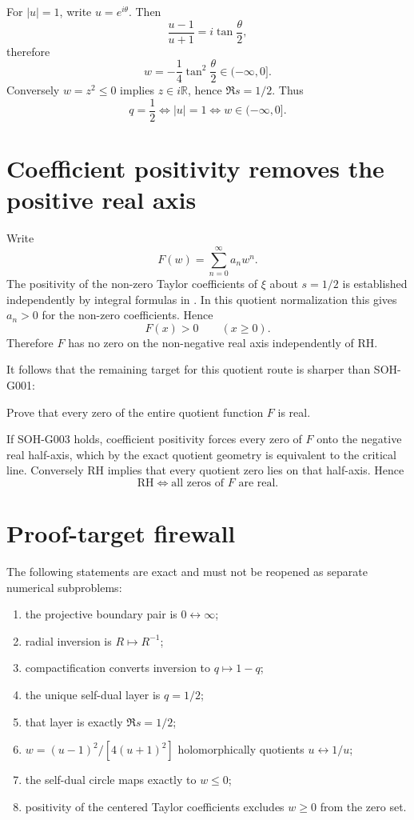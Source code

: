 For $|u|=1$, write $u=e^{i\theta}$. Then
\[
\frac{u-1}{u+1}=i\tan\frac{\theta}{2},
\]
therefore
\[
\boxed{w=-\frac14\tan^2\frac{\theta}{2}\in(-\infty,0].}
\]
Conversely $w=z^2\le0$ implies $z\in i\mathbb R$, hence $\Re s=1/2$. Thus
\[
\boxed{
q=\frac12
\iff |u|=1
\iff w\in(-\infty,0].
}
\]

\section{Coefficient positivity removes the positive real axis}

Write
\[
F(w)=\sum_{n=0}^{\infty}a_n w^n.
\]
The positivity of the non-zero Taylor coefficients of $\xi$ about $s=1/2$ is established independently by integral formulas in \citet{defranco2019xi}. In this quotient normalization this gives $a_n>0$ for the non-zero coefficients. Hence
\[
\boxed{F(x)>0\qquad(x\ge0).}
\]
Therefore $F$ has no zero on the non-negative real axis independently of RH.

It follows that the remaining target for this quotient route is sharper than SOH-G001:

\begin{problem}
Prove that every zero of the entire quotient function $F$ is real.
\end{problem}

If SOH-G003 holds, coefficient positivity forces every zero of $F$ onto the negative real half-axis, which by the exact quotient geometry is equivalent to the critical line. Conversely RH implies that every quotient zero lies on that half-axis. Hence
\[
\boxed{
\mathrm{RH}
\iff
\text{all zeros of }F\text{ are real}.
}
\]


\section{Proof-target firewall}

The following statements are exact and must not be reopened as separate numerical subproblems:
\begin{enumerate}
\item the projective boundary pair is $0\leftrightarrow\infty$;
\item radial inversion is $R\mapsto R^{-1}$;
\item compactification converts inversion to $q\mapsto1-q$;
\item the unique self-dual layer is $q=1/2$;
\item that layer is exactly $\Re s=1/2$;
\item $w=(u-1)^2/[4(u+1)^2]$ holomorphically quotients $u\leftrightarrow1/u$;
\item the self-dual circle maps exactly to $w\le0$;
\item positivity of the centered Taylor coefficients excludes $w\ge0$ from the zero set.
\end{enumerate}

